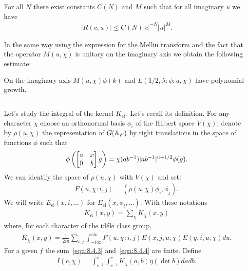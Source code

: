 \begin{lemma}
For all $N$ there exist constants $C(N)$ and $M$ such that for all imaginary $u$ we have
\begin{align*}
    |R(c, u)| \leq C(N)|c|^{-N} |u|^{M}.
\end{align*}
\end{lemma}
In the same way using the expression for the Mellin transform and the fact that the operator $M(u, \chi)$ is unitary on the imaginary axis we obtain the following estimate:

\begin{lemma}\label{lem:8.3}
On the imaginary axis $M(u, \chi)\phi(k)$ and $L(1/2, \lambda:\phi:u, \chi)$ have polynomial growth.
\end{lemma}


\subsection{}
Let's study the integral of the kernel $K_{\mathrm{et}}$.
Let's recall its definition.
For any character $\chi$ choose an orthonormal basis $\phi_i$ of the Hilbert space $V(\chi)$;
denote by $\rho(u, \chi)$ the representation of $G(\mathbb{A}_F)$ by right translations in the space of functions $\phi$ such that
\begin{align}
    \phi\left(\begin{bmatrix} a & x \\ 0 & b \end{bmatrix} g\right) = \chi(ab^{-1}) |ab^{-1}|^{u + 1/2} \phi(g).
\end{align}
We can identify the space of $\rho(u, \chi)$ with $V(\chi)$ and set:
\begin{align}
    F(u, \chi:i, j) = (\rho(u, \chi)\phi_i, \phi_j).
\end{align}
We will write $E_{\mathrm{ei}}(x, i, \dots)$ for $E_{\mathrm{ei}}(x, \phi_i, \dots)$.
With these notations
\begin{align}
    \label{eqn:8.4.3}
    K_{\mathrm{ei}}(x, y) = \sum_{\chi} K_{\chi}(x, y)
\end{align}
where, for each character of the id\'ele class group, 
\begin{align}
    \label{eqn:8.4.4}
    K_{\chi}(x, y) = \frac{1}{2i\pi} \sum_{i, j} \int_{-i\infty}^{i\infty} F(u, \chi: i, j) E(x, j, u, \chi) \overline{E(y, i, u, \chi)} du.
\end{align}
For a given $f$ the sum~\eqref{eqn:8.4.3} and~\eqref{eqn:8.4.4} are finite.
Define
\begin{align}
    I(c, \chi) = \int_{c^{-1}}^{c} \int_{c^{-1}}^{c} K_\chi(a, b) \eta(\det b) dadb.
\end{align}
